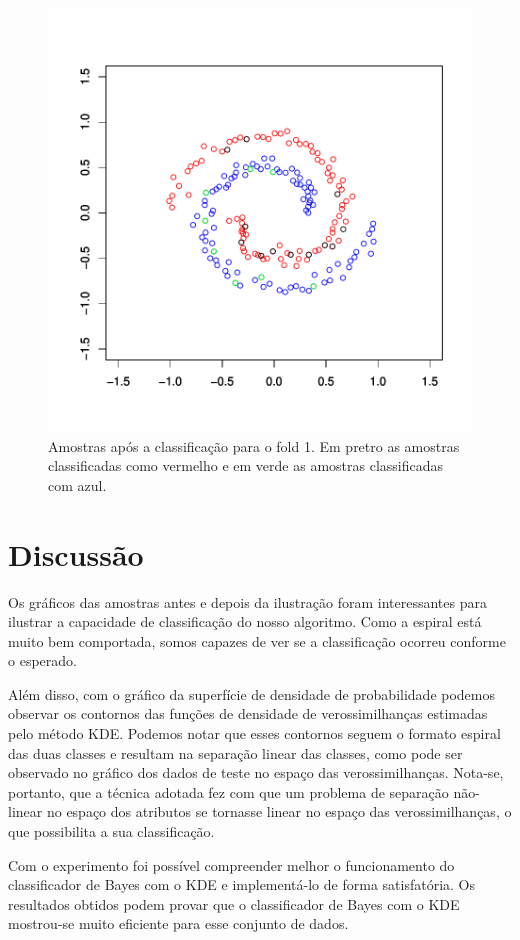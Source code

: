 \documentclass[12pt]{article}
\begin{document}
\begin{figure}[h]
\centering
\includegraphics{KDE-007}
\caption{Amostras após a classificação para o fold 1. Em pretro as amostras classificadas como vermelho e em verde as amostras classificadas com azul. }
\label{10}
\end{figure}

\section{Discussão}

  \par Os gráficos das amostras antes e depois da ilustração foram interessantes para ilustrar a capacidade de classificação do nosso algoritmo. Como a espiral está muito bem comportada, somos capazes de ver se a classificação ocorreu conforme o esperado.
  
  \par Além disso, com o gráfico da superfície de densidade de probabilidade podemos observar os contornos das funções de densidade de verossimilhanças estimadas pelo método KDE. Podemos notar que esses contornos seguem o formato espiral das duas classes e resultam na separação linear das classes, como pode ser observado no gráfico dos dados de teste no espaço das verossimilhanças. Nota-se, portanto, que a técnica adotada fez com que um problema de separação não-linear no espaço dos atributos se tornasse linear no espaço das verossimilhanças, o que possibilita a sua classificação.
  
   \par Com o experimento foi possível compreender melhor o funcionamento do classificador de Bayes com o KDE e implementá-lo de forma satisfatória. Os resultados obtidos podem provar que o classificador de Bayes com o KDE mostrou-se muito eficiente para esse conjunto de dados. 

\end{document}
